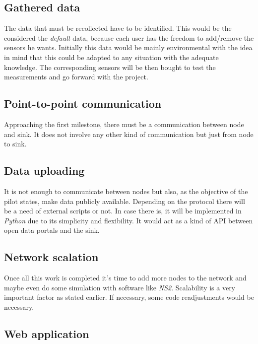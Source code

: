 \documentclass[a4paper,english]{article}
\begin{document}
        \subsection{Gathered data}

            The data that must be recollected have to be identified. This would be the considered the \emph{default} data, because each user has the freedom to add/remove the sensors he wants. Initially this data would be mainly environmental with the idea in mind that this could be adapted to any situation with the adequate knowledge. The corresponding sensors will be then bought to test the measurements and go forward with the project.


        \subsection{Point-to-point communication}

            Approaching the first milestone, there must be a communication between node and sink. It does not involve any other kind of communication but just from node to sink.


        \subsection{Data uploading}

            It is not enough to communicate between nodes but also, as the objective of the pilot states, make data publicly available. Depending on the protocol there will be a need of external scripts or not. In case there is, it will be implemented in \emph{Python} due to its simplicity and flexibility. It would act as a kind of API between open data portals and the sink.


        \subsection{Network scalation}

        Once all this work is completed it's time to add more nodes to the network and maybe even do some simulation with software like \emph{NS2}. Scalability is a very important factor as stated earlier. If necessary, some code readjustments would be necessary.


        \subsection{Web application}
\end{document}
